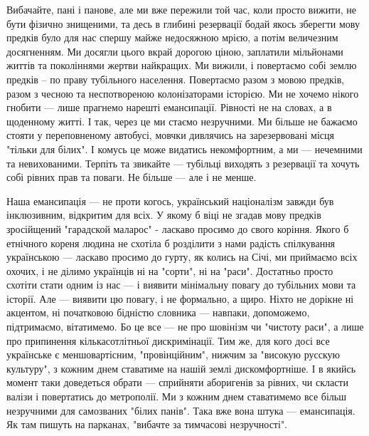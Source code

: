 Вибачайте, пані і панове, але ми вже пережили той час, коли просто вижити, не
бути фізично знищеними, та десь в глибині резервації бодай якось зберегти мову
предків було для нас спершу майже недосяжною мрією, а потім величезним
досягненням. Ми досягли цього вкрай дорогою ціною, заплатили мільйонами життів
та поколіннями жертви найкращих. Ми вижили, і повертаємо собі землю предків –
по праву тубільного населення. Повертаємо разом з мовою предків, разом з чесною
та неспотвореною колонізаторами історією. Ми не хочемо нікого гнобити --- лише
прагнемо нарешті емансипації. Рівності не на словах, а в щоденному житті. І
так, через це ми стаємо незручними. Ми більше не бажаємо стояти у переповненому
автобусі, мовчки дивлячись на зарезервовані місця "тільки для білих". І комусь
це може видатись некомфортним, а ми --- нечемними та невихованими. Терпіть та
звикайте --- тубільці виходять з резервації та хочуть собі рівних прав та поваги.
Не більше --- але і не менше.

Наша емансипація --- не проти когось, український націоналізм завжди був
інклюзивним, відкритим для всіх. У якому б віці не згадав мову предків
зросійщений "гарадской маларос" - ласкаво просимо до свого коріння. Якого б
етнічного кореня людина не схотіла б розділити з нами радість спілкування
українською --- ласкаво просимо до гурту, як колись на Січі, ми приймаємо всіх
охочих, і не ділимо українців ні на "сорти", ні на "раси". Достатньо просто
схотіти стати одним із нас --- і виявити мінімальну повагу до тубільних мови та
історії. Але --- виявити цю повагу, і не формально, а щиро. Ніхто не дорікне ні
акцентом, ні початковою бідністю словника --- навпаки, допоможемо, підтримаємо,
вітатимемо. Бо це все --- не про шовінізм чи "чистоту раси", а лише про
припинення кількасотлітньої дискримінації. Тим же, для кого досі все українське
є меншовартісним, "провінційним", нижчим за "високую русскую культуру", з
кожним днем ставатиме на нашій землі дискомфортніше. І в якийсь момент таки
доведеться обрати --- сприйняти аборигенів за рівних, чи скласти валізи і
повертатись до метрополії. Ми з кожним днем ставатимемо все більш незручними
для самозваних "білих панів". Така вже вона штука --- емансипація. Як там пишуть
на парканах, "вибачте за тимчасові незручності".
